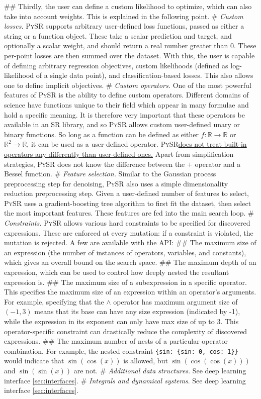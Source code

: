 \documentclass[letterpaper,twocolumn]{scrartcl}
\newcommand\pysr{\textsc{PySR}\xspace}
\begin{document}
\begin{easylist}[itemize]
## Thirdly, the user can define a custom likelihood to optimize, which can also take into account weights. This is explained in the following point.
# \textit{Custom losses.}
\pysr supports arbitrary user-defined loss functions, passed as either a string or a function object.
These take a scalar prediction and target, and optionally a scalar weight, and should return a real number greater than 0.
These per-point losses are then summed over the dataset.
With this, the user is capable of defining arbitrary regression objectives, custom likelihoods (defined as log-likelihood of a single data point), and classification-based losses.
This also allows one to define implicit objectives.
# \textit{Custom operators.}
One of the most powerful features of \pysr is the ability to define custom operators.
Different domains of science have functions unique to their field which appear in many formulae and hold a specific meaning.
It is therefore very important that these operators be available in an SR library, and so \pysr allows custom user-defined unary or binary functions.
So long as a function can be defined as either
$f:\mathbb{R}\rightarrow \mathbb{R}$ or $\mathbb{R}^2\rightarrow\mathbb{R}$, it can be used as a user-defined operator.
\pysr \ul{does not treat built-in operators any differently than user-defined ones.}
Apart from simplification strategies, \pysr does not know the difference between the $+$ operator and a Bessel function.
# \textit{Feature selection.}
Similar to the Gaussian process preprocessing step for denoising, \pysr also uses a simple dimensionality reduction preprocessing step.
Given a user-defined number of features to select, \pysr uses a gradient-boosting tree algorithm to first fit the dataset, then select the most important features.
These features are fed into the main search loop.
# \textit{Constraints.}
\pysr allows various hard constraints to be specified for discovered expressions.
These are enforced at every mutation: if a constraint is violated, the mutation is rejected. A few are available with the API:
## The maximum size of an expression (the number of instances of operators, variables, and constants), which gives an overall bound on the search space.
## The maximum depth of an expression, which can be used to control how deeply nested the resultant expression is.
## The maximum size of a subexpression in a specific operator.
This specifies the maximum size of an expression within an operator's arguments.
For example, specifying that the $\wedge$ operator has maximum argument size of $(-1, 3)$ means that its base can have any size expression (indicated by -1), while the expression in its exponent can only have max size of up to 3.
This operator-specific constraint can drastically reduce the complexity of discovered expressions.
## The maximum number of nests of a particular operator combination. For example, the nested constraint \texttt{\{sin: \{sin: 0, cos: 1\}\}} would indicate that $\sin(\cos(x))$ is allowed, but $\sin(\cos(\cos(x)))$ and $\sin(\sin(x))$ are not.
# \textit{Additional data structures}. See deep learning interface \cref{sec:interfaces}.
# \textit{Integrals and dynamical systems}. See deep learning interface \cref{sec:interfaces}.
\end{easylist}
\end{document}
